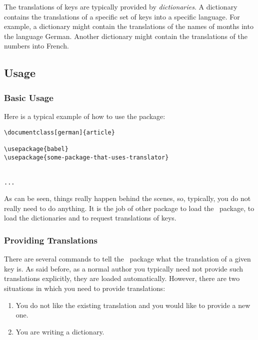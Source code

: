 The translations of keys are typically provided by \emph{dictionaries}. A dictionary contains the translations of a specific set of keys into a specific language. For example, a dictionary might contain the translations of the names of months into the language German. Another dictionary might contain the translations of the numbers into French.


\subsection{Usage}

\subsubsection{Basic Usage}

Here is a typical example of how to use the package:
\begin{verbatim}
\documentclass[german]{article}

\usepackage{babel}
\usepackage{some-package-that-uses-translator}


...

\end{verbatim}
As can be seen, things really happen behind the scenes, so, typically, you do not really need to do anything. It is the job of other package to load the \translatorname\ package, to load the dictionaries and to request translations of keys.

\subsubsection{Providing Translations}

There are several commands to tell the \translatorname\ package what the translation of a given key is. As said before, as a normal author you typically need not provide such translations explicitly, they are loaded automatically. However, there are two situations in which you need to provide translations:
\begin{enumerate}
\item
  You do not like the existing translation and you would like to provide a new one.
\item
  You are writing a dictionary.
\end{enumerate}

